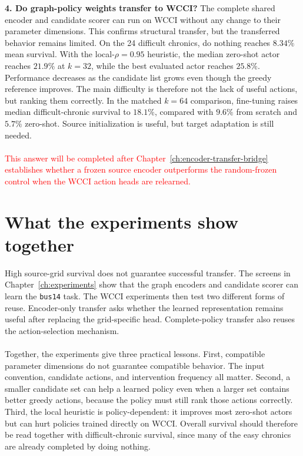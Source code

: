 \medskip
\noindent\textbf{4. Do graph-policy weights transfer to WCCI?}
The complete shared encoder and candidate scorer can run on WCCI without any
change to their parameter dimensions. This confirms structural transfer, but
the transferred behavior remains limited. On the 24 difficult chronics, do
nothing reaches $8.34\%$ mean survival. With the local-$\rho=0.95$ heuristic,
the median zero-shot actor reaches $21.9\%$ at $k=32$, while the best evaluated
actor reaches $25.8\%$. Performance decreases as the candidate list grows even
though the greedy reference improves. The main difficulty is therefore not
the lack of useful actions, but ranking them correctly. In the matched $k=64$
comparison, fine-tuning raises median difficult-chronic survival to $18.1\%$,
compared with $9.6\%$ from scratch and $5.7\%$ zero-shot. Source initialization
is useful, but target adaptation is still needed.
\\
\\
\textcolor{red}{This answer will be completed after Chapter~\ref{ch:encoder-transfer-bridge}
establishes whether a frozen source encoder outperforms the random-frozen
control when the WCCI action heads are relearned.}

\section{What the experiments show together}

High source-grid survival does not guarantee successful transfer. The screens
in Chapter~\ref{ch:experiments} show that the graph encoders and candidate
scorer can learn the \texttt{bus14} task. The WCCI experiments then test two
different forms of reuse. Encoder-only transfer asks whether the learned
representation remains useful after replacing the grid-specific head.
Complete-policy transfer also reuses the action-selection mechanism.
\\
\\
Together, the experiments give three practical lessons. First, compatible
parameter dimensions do not guarantee compatible behavior. The input
convention, candidate actions, and intervention frequency all matter. Second,
a smaller candidate set can help a learned policy even when a larger set
contains better greedy actions, because the policy must still rank those
actions correctly. Third, the local heuristic is policy-dependent: it improves
most zero-shot actors but can hurt policies trained directly on WCCI. Overall
survival should therefore be read together with difficult-chronic survival,
since many of the easy chronics are already completed by doing nothing.

